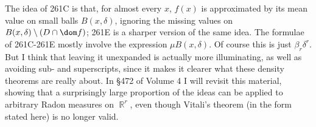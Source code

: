 {The idea of 261C is that, for almost every $x$, $f(x)$ is approximated 
by its mean value on small balls $B(x,\delta)$, ignoring the missing 
values on $B(x,\delta)\setminus(D\cap\dom f)$;  261E is a sharper 
version of the same idea. 
The formulae of 261C-261E mostly involve the expression 
$\mu B(x,\delta)$.   Of course this is just $\beta_r\delta^r$.   But I 
think that leaving it unexpanded is actually more illuminating, as well 
as avoiding sub- and superscripts, since it makes it clearer what these 
density theorems are really about.   In \S472 of Volume 4 I will revisit  
this material, showing that a surprisingly large proportion of the ideas  
can be applied to arbitrary Radon measures on $\BbbR^r$, even though 
Vitali's theorem (in the form stated here) is no longer valid. 
      
}%
      
      
\discrpage 
      
